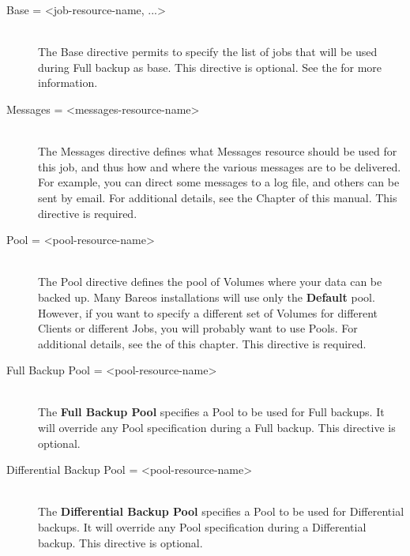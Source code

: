 \begin{description}
\item [Base = {\textless}job-resource-name, ...{\textgreater}] \hfill \\
The Base directive permits to specify the list of jobs that will be used during
Full backup as base. This directive is optional. See the  for more information.

\item [Messages = {\textless}messages-resource-name{\textgreater}] \hfill \\
The Messages directive defines what Messages resource should be used for
this job, and thus how and where the various messages are to be
delivered.  For example, you can direct some messages to a log file, and
others can be sent by email.  For additional details, see the
 Chapter of this manual.  This
directive is required.

\item [Pool = {\textless}pool-resource-name{\textgreater}] \hfill \\
The Pool directive defines the pool of Volumes where your data can be
backed up.  Many Bareos installations will use only the {\bf Default}
pool.  However, if you want to specify a different set of Volumes for
different Clients or different Jobs, you will probably want to use
Pools.  For additional details, see the  of this chapter.  This directive is required.

\item [Full Backup Pool = {\textless}pool-resource-name{\textgreater}] \hfill \\
The {\bf Full Backup Pool} specifies a Pool to be used for Full backups.
It will override any Pool specification during a Full backup.  This
directive is optional.

\item [Differential Backup Pool = {\textless}pool-resource-name{\textgreater}] \hfill \\
The {\bf Differential Backup Pool} specifies a Pool to be used for
Differential backups.  It will override any Pool specification during a
Differential backup.  This directive is optional.


\end{description}
